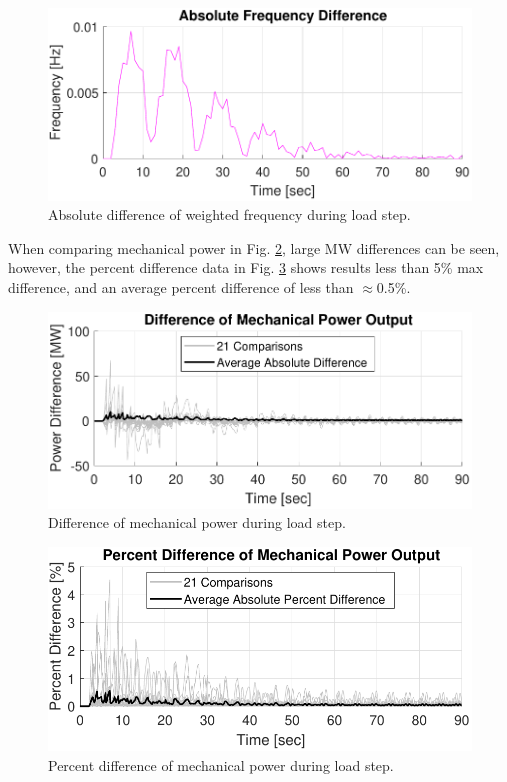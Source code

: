 \begin{figure}[!t]
	\centering
	\includegraphics[width=\linewidth]{figures/miniWECC3ALTDstepRelF}
	\caption{Absolute difference of weighted frequency during load step.}
	\label{fig: stepFdif}
\end{figure}

When comparing mechanical power in Fig. \ref{fig: stepPmdif}, large MW differences can be seen, however, the percent difference data in Fig. \ref{fig: stepPmPercentdif} shows results less than 5\% max difference, and an average percent difference of less than $\approx$0.5\%.

\begin{figure}[!ht]
	\centering
	\includegraphics[width=\linewidth]{figures/miniWECC3ALTDstepPm2}
	\caption{Difference of mechanical power during load step.}
	\label{fig: stepPmdif}
\end{figure}

\begin{figure}[!ht]
	\centering
	\includegraphics[width=\linewidth]{figures/miniWECC3ALTDstepPm3}
	\caption{Percent difference of mechanical power during load step.}
	\label{fig: stepPmPercentdif}
\end{figure}


